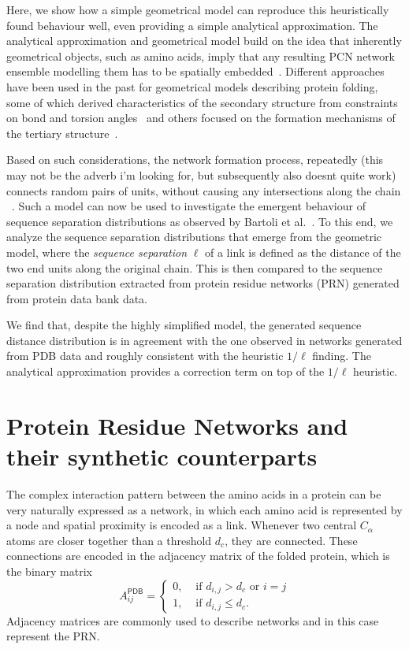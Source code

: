 \documentclass[reprint,amsmath,amssymb,rmp,onecolumn,notitlepage,11pt]{revtex4-1}
\newcommand{\red}[1]{\textcolor{red!80!black}{#1}}
\begin{document}
Here, we show how a simple geometrical model can reproduce this heuristically found behaviour well, even providing a simple analytical approximation. The analytical approximation and geometrical model build on the idea that inherently geometrical objects, such as amino acids, imply that any resulting PCN network ensemble modelling them has to be spatially embedded~\cite{molkenthin2016scaling, molkenthin2020self}. 
Different approaches have been used in the past for geometrical models describing protein folding, some of which derived characteristics of the secondary structure from constraints on bond and torsion angles~\cite{maybe cite Flory stuff here as well?,Danielsson2010,Molkenthin2011} and others focused on the formation mechanisms of the tertiary structure~\cite{molkenthin2016scaling, molkenthin2020self}. 

Based on such considerations, the network formation process, repeatedly \red{(this may not be the adverb i'm looking for, but subsequently also doesnt quite work)} connects random pairs of units, without causing any intersections along the chain ~\cite{molkenthin2016scaling}. Such a model can now be used to investigate the emergent behaviour of sequence separation distributions as observed by Bartoli et al.~\cite{bartoli2008effect}. To this end, we analyze the sequence separation distributions that emerge from the geometric model, where the \emph{sequence separation} $\ell$ of a link is defined as the distance of the two end units along the original chain.
This is then compared to the sequence separation distribution extracted from protein residue networks (PRN) generated from protein data bank data. 

\red{We find that, despite the highly simplified model, the generated sequence distance distribution is in agreement with the one observed in networks generated from PDB data and roughly consistent with the heuristic $1/\ell$ finding. The analytical approximation provides a correction term on top of the $1/\ell$ heuristic.}


\section*{Protein Residue Networks and their synthetic counterparts}
The complex interaction pattern between the amino acids in a protein can be very naturally expressed as a network, in which each amino acid is represented by a node and spatial proximity is encoded as a link. Whenever two central $C_\alpha$ atoms are closer together than a threshold $d_c$, they are connected. These connections are encoded in the adjacency matrix of the folded protein, which is the binary matrix
\begin{equation}
  A^{\textsf{PDB}}_{ij}=
  \begin{cases}
   0, & \text{ if } d_{i,j}>d_c \text{ or } i=j\\
      1, & \text{ if } d_{i,j}\leq d_c .
      \end{cases}
    \label{eq:aij}
\end{equation}
Adjacency matrices are commonly used to describe networks and in this case represent the PRN.
\end{document}
